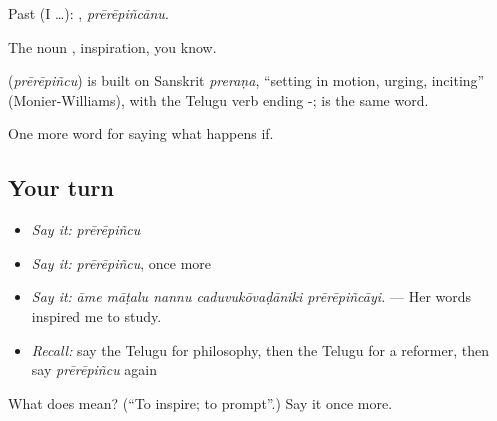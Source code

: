 Past (I …): , \emph{prērēpiñcānu}.

The noun , inspiration, you know.

\begin{cousinweb}
\textbf{} (\emph{prērēpiñcu}) is built on Sanskrit \emph{preraṇa}, \textquotedblleft{}setting in motion, urging, inciting\textquotedblright{} (Monier-Williams), with the Telugu verb ending -;  is the same word.
\end{cousinweb}

\begin{grammarlens}[title={What you've built}]
One more word for saying what happens if.
\end{grammarlens}

\subsection*{Your turn}
\begin{itemize}
\raggedright
  \item \emph{Say it:} \emph{prērēpiñcu}
  \item \emph{Say it:} \emph{prērēpiñcu}, once more
  \item \emph{Say it:} \emph{āme māṭalu nannu caduvukōvaḍāniki prērēpiñcāyi.} — Her words inspired me to study.
  \item \emph{Recall:} say the Telugu for philosophy, then the Telugu for a reformer, then say \emph{prērēpiñcu} again
\end{itemize}

\begin{tcolorbox}[breakable,colback=teal!4,colframe=teal!35!black,title={Before you move on}]
What does  mean? (\textquotedblleft{}To inspire; to prompt\textquotedblright{}.) Say it once more.
\end{tcolorbox}
